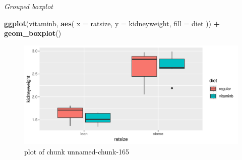 \documentclass[ignorenonframetext,]{beamer}
\newenvironment{Shaded}{\begin{snugshade}}{\end{snugshade}}
\newcommand{\DataTypeTok}[1]{\textcolor[rgb]{0.13,0.29,0.53}{#1}}
\newcommand{\KeywordTok}[1]{\textcolor[rgb]{0.13,0.29,0.53}{\textbf{#1}}}
\newcommand{\NormalTok}[1]{#1}
\newcommand{\OperatorTok}[1]{\textcolor[rgb]{0.81,0.36,0.00}{\textbf{#1}}}
\newcommand{\StringTok}[1]{\textcolor[rgb]{0.31,0.60,0.02}{#1}}
\begin{document}
\begin{frame}[fragile]{\emph{Grouped boxplot}}
\protect\hypertarget{grouped-boxplot}{}

\begin{Shaded}
\begin{Highlighting}[]
\KeywordTok{ggplot}\NormalTok{(vitaminb, }\KeywordTok{aes}\NormalTok{(}
  \DataTypeTok{x =}\NormalTok{ ratsize, }\DataTypeTok{y =}\NormalTok{ kidneyweight,}
  \DataTypeTok{fill =}\NormalTok{ diet}
\NormalTok{)) }\OperatorTok{+}\StringTok{ }\KeywordTok{geom_boxplot}\NormalTok{()}
\end{Highlighting}
\end{Shaded}

\begin{figure}
\centering
\includegraphics{figure/unnamed-chunk-165-1.pdf}
\caption{plot of chunk unnamed-chunk-165}
\end{figure}

\end{frame}
\end{document}
